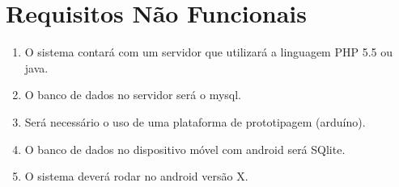 \documentclass[11pt]{article}
\begin{document}
\section{Requisitos N\~ao Funcionais}
\begin{enumerate}
    \item O sistema contará com um servidor que utilizará a linguagem PHP 5.5 ou java.
    \item O banco de dados no servidor será o mysql.
    \item Será necessário o uso de uma plataforma de prototipagem (arduíno).
    \item O banco de dados no dispositivo móvel com android será SQlite.
    \item O sistema deverá rodar no android versão X.
    
\end{enumerate}
\end{document}
